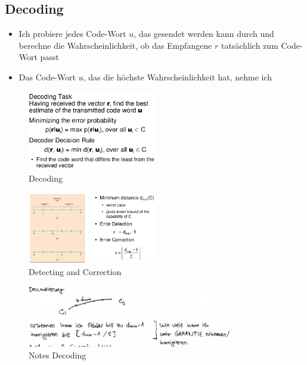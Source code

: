 \hypertarget{decoding}{%
\subsection{Decoding}\label{decoding}}

\begin{itemize}
\tightlist
\item
  Ich probiere jedes Code-Wort $u$, das gesendet werden kann durch und
  berechne die Wahrscheinlichkeit, ob das Empfangene $r$ tatsächlich zum
  Code-Wort passt
\item
  Das Code-Wort $u$, das die höchste Wahrscheinlichkeit hat, nehme ich
\end{itemize}

\begin{figure}[H]
\centering
\includegraphics[width=0.5\textwidth]{figures/decoding.png}
\caption{Decoding}
\end{figure}

\begin{figure}[H]
\centering
\includegraphics[width=0.5\textwidth]{figures/detecting.png}
\caption{Detecting and Correction}
\end{figure}

\begin{figure}[H]
\centering
\includegraphics[width=0.8\textwidth]{figures/notesDecoding.png}
\caption{Notes Decoding}
\end{figure}

